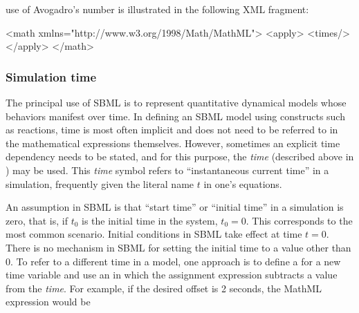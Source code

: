  use of Avogadro's number is illustrated in the
following XML fragment:

\begin{example}
<math xmlns="http://www.w3.org/1998/Math/MathML">
    <apply>
        <times/>
    </apply>
</math>
\end{example}


\begin{example}
\end{example}


\subsubsection{Simulation time}
\label{sec:meaning-of-time}

The principal use of SBML is to represent quantitative dynamical
models whose behaviors manifest over time.  In defining an
SBML model using constructs such as reactions, time is most often
implicit and does not need to be referred to in the mathematical
expressions themselves.  However, sometimes an explicit time
dependency needs to be stated, and for this purpose, the
\emph{time}  (described above in
) may be used.  This \emph{time}
symbol refers to ``instantaneous current time'' in a simulation,
frequently given the literal name $t$ in one's equations.

An assumption in SBML is that ``start time'' or ``initial time''
in a simulation is zero, that is, if $t_0$ is the initial time in
the system, $t_0 = 0$.  This corresponds to the most common
scenario.  Initial conditions in SBML take effect at time $t = 0$.
There is no mechanism in SBML for setting the initial time to a
value other than 0.  To refer to a different time in a model, one
approach is to define a \Parameter for a new time variable and use
an \AssignmentRule in which the assignment expression subtracts a
value from the  \emph{time}.  For example, if the
desired offset is 2 seconds, the MathML expression would be

